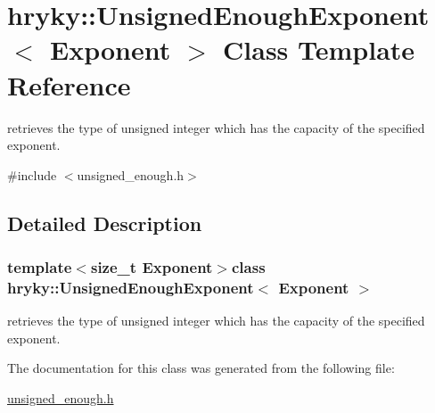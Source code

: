 \hypertarget{classhryky_1_1_unsigned_enough_exponent}{\section{hryky\-:\-:Unsigned\-Enough\-Exponent$<$ Exponent $>$ Class Template Reference}
\label{classhryky_1_1_unsigned_enough_exponent}
}


retrieves the type of unsigned integer which has the capacity of the specified exponent.  




{\ttfamily \#include $<$unsigned\-\_\-enough.\-h$>$}



\subsection{Detailed Description}
\subsubsection*{template$<$size\-\_\-t Exponent$>$class hryky\-::\-Unsigned\-Enough\-Exponent$<$ Exponent $>$}

retrieves the type of unsigned integer which has the capacity of the specified exponent. 

The documentation for this class was generated from the following file\-:\begin{DoxyCompactItemize}
\item 
\hyperlink{unsigned__enough_8h}{unsigned\-\_\-enough.\-h}\end{DoxyCompactItemize}
